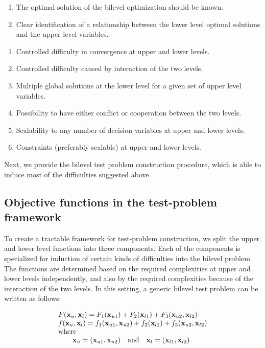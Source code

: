 \documentclass[twoside]{article}
\begin{document}
\vspace{2mm}

\hspace{-7mm}{\bf Necessary Properties:}
\begin{enumerate}
\item The optimal solution of the bilevel optimization should be known.
\item Clear identification of a relationship between the lower level optimal solutions and the upper level variables.
\end{enumerate}

\hspace{-7mm}{\bf Properties for inducing difficulties:}
\begin{enumerate}
\item Controlled difficulty in convergence at upper and lower levels.
\item Controlled difficulty caused by interaction of the two levels.
\item Multiple global solutions at the lower level for a given set of upper level variables.
\item Possibility to have either conflict or cooperation between the two levels.
\item Scalability to any number of decision variables at upper and lower levels.
\item Constraints (preferably scalable) at upper and lower levels.
\end{enumerate}

Next, we provide the bilevel test problem construction procedure, which is able to induce most of the difficulties suggested above.

\subsection{Objective functions in the test-problem framework}

To create a tractable framework for test-problem construction, we split the upper and lower level functions into three components. Each of the components is specialized for induction of certain kinds of difficulties into the bilevel problem. The functions are determined based on the required complexities at upper and lower levels independently, and also by the required complexities because of the interaction of the two levels. In this setting, a generic bilevel test problem can be written as follows:

\begin{equation}
\begin{array}{l}
F(\mbox{$\mathbf{x}$}_u,\mbox{$\mathbf{x}$}_l) = F_1(\mbox{$\mathbf{x}$}_{u1}) + F_2(\mbox{$\mathbf{x}$}_{l1}) + F_3(\mbox{$\mathbf{x}$}_{u2},\mbox{$\mathbf{x}$}_{l2}) \\
f(\mbox{$\mathbf{x}$}_u,\mbox{$\mathbf{x}$}_l) = f_1(\mbox{$\mathbf{x}$}_{u1}, \mbox{$\mathbf{x}$}_{u2}) + f_2(\mbox{$\mathbf{x}$}_{l1}) + f_3(\mbox{$\mathbf{x}$}_{u2},\mbox{$\mathbf{x}$}_{l2})\\

\mbox{where}\\
     \quad \quad \mbox{$\mathbf{x}$}_u = (\mbox{$\mathbf{x}$}_{u1}, \mbox{$\mathbf{x}$}_{u2}) \quad \mbox{and} \quad \mbox{$\mathbf{x}$}_l = (\mbox{$\mathbf{x}$}_{l1}, \mbox{$\mathbf{x}$}_{l2})
\end{array}
\end{equation}
\end{document}
